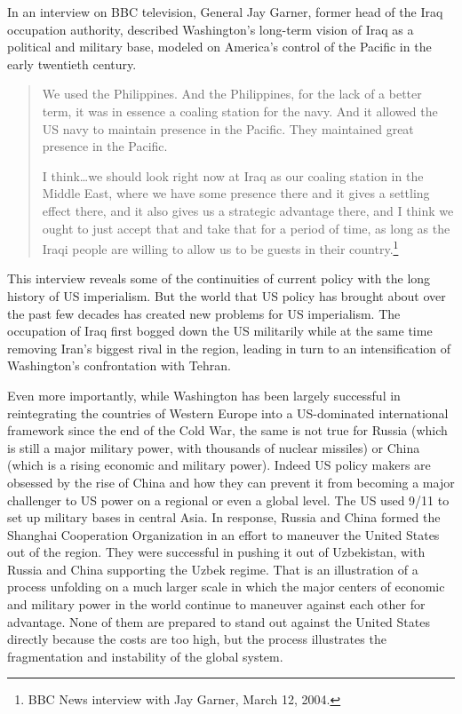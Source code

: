 In an interview on BBC television, General Jay Garner, former head of the Iraq occupation authority, described Washington's long-term vision of Iraq as a political and military base, modeled on America's control of the Pacific in the early twentieth century.

\blockquote{We used the Philippines. And the Philippines, for the lack of a better term, it was in essence a coaling station for the navy. And it allowed the US navy to maintain presence in the Pacific. They maintained great presence in the Pacific.

I think\ldots we should look right now at Iraq as our coaling station in the Middle East, where we have some presence there and it gives a settling effect there, and it also gives us a strategic advantage there, and I think we ought to just accept that and take that for a period of time, as long as the Iraqi people are willing to allow us to be guests in their country.\footnote{BBC News interview with Jay Garner, March 12, 2004.}}

This interview reveals some of the continuities of current policy with the long history of US imperialism. But the world that US policy has brought about over the past few decades has created new problems for US imperialism. The occupation of Iraq first bogged down the US militarily while at the same time removing Iran's biggest rival in the region, leading in turn to an intensification of Washington's confrontation with Tehran.

Even more importantly, while Washington has been largely successful in reintegrating the countries of Western Europe into a US-dominated international framework since the end of the Cold War, the same is not true for Russia (which is still a major military power, with thousands of nuclear missiles) or China (which is a rising economic and military power). Indeed US policy makers are obsessed by the rise of China and how they can prevent it from becoming a major challenger to US power on a regional or even a global level. The US used 9/11 to set up military bases in central Asia. In response, Russia and China formed the Shanghai Cooperation Organization in an effort to maneuver the United States out of the region. They were successful in pushing it out of Uzbekistan, with Russia and China supporting the Uzbek regime. That is an illustration of a process unfolding on a much larger scale in which the major centers of economic and military power in the world continue to maneuver against each other for advantage. None of them are prepared to stand out against the United States directly because the costs are too high, but the process illustrates the fragmentation and instability of the global system.

